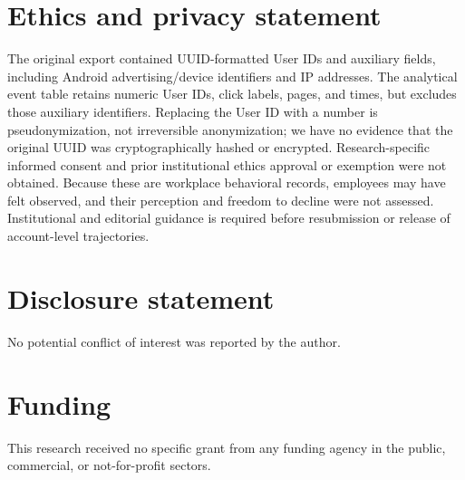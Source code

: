\documentclass[sn-mathphys-num, Numbered]{sn-jnl}%
\theoremstyle{thmstyleone}%
\theoremstyle{thmstyletwo}%
\theoremstyle{thmstylethree}%
\begin{document}
\section*{Ethics and privacy statement}
The original export contained UUID-formatted User IDs and auxiliary fields, including Android advertising/device identifiers and IP addresses. The analytical event table retains numeric User IDs, click labels, pages, and times, but excludes those auxiliary identifiers. Replacing the User ID with a number is pseudonymization, not irreversible anonymization; we have no evidence that the original UUID was cryptographically hashed or encrypted. Research-specific informed consent and prior institutional ethics approval or exemption were not obtained. Because these are workplace behavioral records, employees may have felt observed, and their perception and freedom to decline were not assessed. Institutional and editorial guidance is required before resubmission or release of account-level trajectories.



\section*{Disclosure statement}
No potential conflict of interest was reported by the author.


\section*{Funding}
This research received no specific grant from any funding agency in the public, commercial, or not-for-profit sectors.

\end{document}
